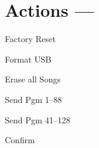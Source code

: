 \section[Actions]{Actions --- \UiKey{\DO}}

Factory Reset


Format USB

Erase all Songs









Send Pgm 1--88

Send Pgm 41--128


































Confirm
